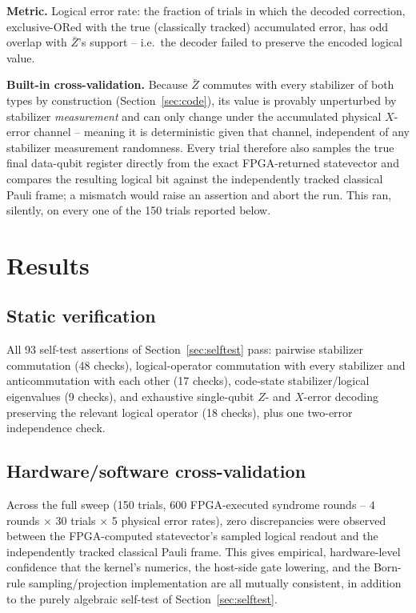 \documentclass[pdflatex,sn-mathphys,Numbered]{sn-jnl}
\begin{document}
\textbf{Metric.} Logical error rate: the fraction of trials in which the decoded correction, exclusive-ORed with the true (classically tracked) accumulated error, has odd overlap with $\bar Z$'s support -- i.e.\ the decoder failed to preserve the encoded logical value.

\textbf{Built-in cross-validation.} Because $\bar Z$ commutes with every stabilizer of both types by construction (Section~\ref{sec:code}), its value is provably unperturbed by stabilizer \emph{measurement} and can only change under the accumulated physical $X$-error channel -- meaning it is deterministic given that channel, independent of any stabilizer measurement randomness. Every trial therefore also samples the true final data-qubit register directly from the exact FPGA-returned statevector and compares the resulting logical bit against the independently tracked classical Pauli frame; a mismatch would raise an assertion and abort the run. This ran, silently, on every one of the 150 trials reported below.

\section{Results}\label{sec:results}

\subsection{Static verification}

All 93 self-test assertions of Section~\ref{sec:selftest} pass: pairwise stabilizer commutation (48 checks), logical-operator commutation with every stabilizer and anticommutation with each other (17 checks), code-state stabilizer/logical eigenvalues (9 checks), and exhaustive single-qubit $Z$- and $X$-error decoding preserving the relevant logical operator (18 checks), plus one two-error independence check.

\subsection{Hardware/software cross-validation}

Across the full sweep (150 trials, 600 FPGA-executed syndrome rounds -- $4$ rounds $\times$ 30 trials $\times$ 5 physical error rates), zero discrepancies were observed between the FPGA-computed statevector's sampled logical readout and the independently tracked classical Pauli frame. This gives empirical, hardware-level confidence that the kernel's numerics, the host-side gate lowering, and the Born-rule sampling/projection implementation are all mutually consistent, in addition to the purely algebraic self-test of Section~\ref{sec:selftest}.
\end{document}
